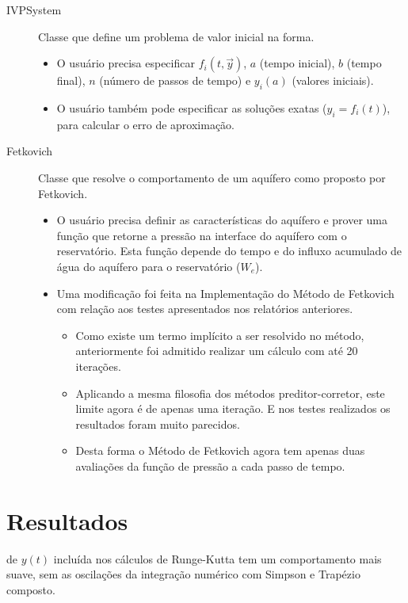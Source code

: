 \documentclass[final,5p]{elsarticle}
\numberwithin{equation}{section}
\begin{document}
        \begin{description}
            \item[IVPSystem] Classe que define um problema de valor inicial na forma.
            \begin{itemize}
                \item O usuário precisa especificar $f_i(t,\overrightarrow{y})$, $a$ (tempo inicial), $b$ (tempo final), $n$ (número de passos de tempo) e $y_i(a)$ (valores iniciais).
                \item O usuário também pode especificar as soluções exatas ($y_i=f_i(t)$), para calcular o erro de aproximação.
            \end{itemize}
            \item[Fetkovich] Classe que resolve o comportamento de um aquífero como proposto por Fetkovich.
            \begin{itemize}
                \item O usuário precisa definir as características do aquífero e prover uma função que retorne a pressão na interface do aquífero com o reservatório. Esta função depende do tempo e do influxo acumulado de água do aquífero para o reservatório ($W_e$).
                \item Uma modificação foi feita na Implementação do Método de Fetkovich com relação aos testes apresentados nos relatórios anteriores.
                \begin{itemize}
                    \item Como existe um termo implícito a ser resolvido no método, anteriormente foi admitido realizar um cálculo com até 20 iterações.
                    \item Aplicando a mesma filosofia dos métodos preditor-corretor, este limite agora é de apenas uma iteração. E nos testes realizados os resultados foram muito parecidos.
                    \item Desta forma o Método de Fetkovich agora tem apenas duas avaliações da função de pressão a cada passo de tempo.
                \end{itemize}
            \end{itemize}
        \end{description}

\section{Resultados}

        de $y(t)$ incluída nos cálculos de Runge-Kutta tem um comportamento mais suave, sem as oscilações da integração numérico com Simpson e Trapézio composto.
\end{document}
